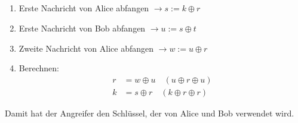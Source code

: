 \documentclass{../crypto}
\begin{document}
\subsection{}
\begin{enumerate}
    \item Erste Nachricht von Alice abfangen $\rightarrow s := k \oplus r$
    \item Erste Nachricht von Bob abfangen $\rightarrow u := s \oplus t$
    \item Zweite Nachricht von Alice abfangen $\rightarrow w := u \oplus r$
    \item Berechnen: 
        \begin{align*}
           r & = w \oplus u \quad \left(u \oplus r \oplus u\right)\\
           k & = s \oplus r \quad \left(k \oplus r \oplus r\right)
        \end{align*}
\end{enumerate}
Damit hat der Angreifer den Schlüssel, der von Alice und Bob verwendet wird.
\end{document}
